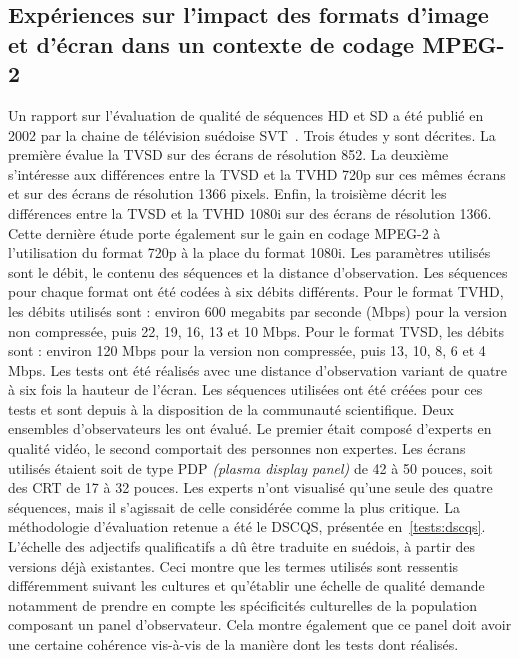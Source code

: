 \subsection{Expériences sur l'impact des formats d'image et d'écran dans un contexte de codage MPEG-2} \label{ssec:svt}
Un rapport sur l'évaluation de qualité de séquences HD et SD a été publié en 2002 par la chaine de télévision suédoise SVT~\cite{svt-assesstudy}. Trois études y sont décrites. La première évalue la TVSD sur des écrans de résolution 852. La deuxième s'intéresse aux différences entre la TVSD et la TVHD 720p sur ces mêmes écrans et sur des écrans de résolution 1366 pixels. Enfin, la troisième décrit les différences entre la TVSD et la TVHD 1080i sur des écrans de résolution 1366. Cette dernière étude porte également sur le gain en codage MPEG-2 à l'utilisation du format 720p à la place du format 1080i. Les paramètres utilisés sont le débit, le contenu des séquences et la distance d'observation. Les séquences pour chaque format ont été codées à six débits différents. Pour le format TVHD, les débits utilisés sont : environ 600 megabits par seconde (Mbps) pour la version non compressée, puis 22, 19, 16, 13 et 10 Mbps. Pour le format TVSD, les débits sont : environ 120 Mbps pour la version non compressée, puis 13, 10, 8, 6 et 4 Mbps. Les tests ont été réalisés avec une distance d'observation variant de quatre à six fois la hauteur de l'écran. Les séquences utilisées ont été créées pour ces tests et sont depuis à la disposition de la communauté scientifique. Deux ensembles d'observateurs les ont évalué. Le premier était composé d'experts en qualité vidéo, le second comportait des personnes non expertes. Les écrans utilisés étaient soit de type PDP \emph{(plasma display panel)} de 42 à 50 pouces, soit des CRT de 17 à 32 pouces. Les experts n'ont visualisé qu'une seule des quatre séquences, mais il s'agissait de celle considérée comme la plus critique. La méthodologie d'évaluation retenue a été le DSCQS, présentée en~\ref{tests:dscqs}. L'échelle des adjectifs qualificatifs a dû être traduite en suédois, à partir des versions déjà existantes. Ceci montre que les termes utilisés sont ressentis différemment suivant les cultures et qu'établir une échelle de qualité demande notamment de prendre en compte les spécificités culturelles de la population composant un panel d'observateur. Cela montre également que ce panel doit avoir une certaine cohérence vis-à-vis de la manière dont les tests dont réalisés.


